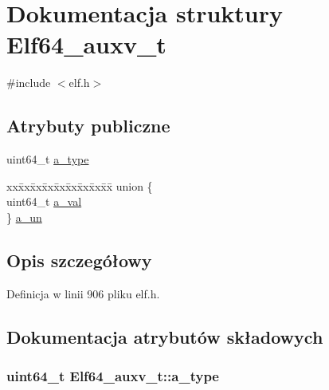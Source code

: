 \hypertarget{struct_elf64__auxv__t}{\section{Dokumentacja struktury Elf64\-\_\-auxv\-\_\-t}
\label{struct_elf64__auxv__t}
}


{\ttfamily \#include $<$elf.\-h$>$}

\subsection*{Atrybuty publiczne}
\begin{DoxyCompactItemize}
\item 
uint64\-\_\-t \hyperlink{struct_elf64__auxv__t_aa4799367aa86aa03c70a44148b14d000}{a\-\_\-type}
\item 
\begin{tabbing}
xx\=xx\=xx\=xx\=xx\=xx\=xx\=xx\=xx\=\kill
union \{\\
\>uint64\_t \hyperlink{struct_elf64__auxv__t_ae9741865b74b4fbe872d5de874feb207}{a\_val}\\
\} \hyperlink{struct_elf64__auxv__t_a988fa43fd867a7c0b571fa9f505ecc1c}{a\_un}\\

\end{tabbing}\end{DoxyCompactItemize}


\subsection{Opis szczegółowy}


Definicja w linii 906 pliku elf.\-h.



\subsection{Dokumentacja atrybutów składowych}
\hypertarget{struct_elf64__auxv__t_aa4799367aa86aa03c70a44148b14d000}{
\subsubsection[{a\-\_\-type}]{\setlength{\rightskip}{0pt plus 5cm}uint64\-\_\-t Elf64\-\_\-auxv\-\_\-t\-::a\-\_\-type}}\label{struct_elf64__auxv__t_aa4799367aa86aa03c70a44148b14d000}


